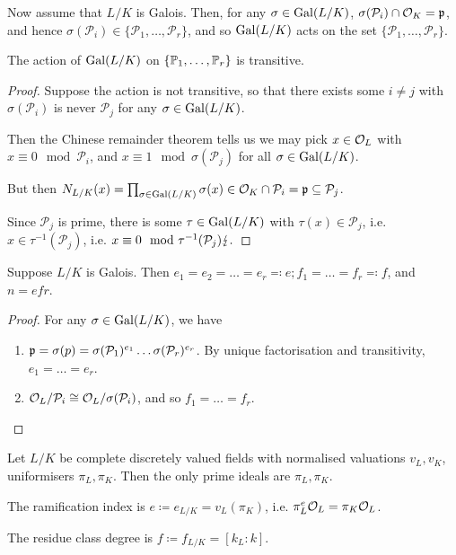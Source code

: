 \documentclass[10pt,a4paper]{article}
\begin{document}
Now assume that $L/K$ is Galois. Then, for any $\sigma \in \Gal(L/K)$, $\sigma(\mathcal{P}_i) \cap \O_K = \p$, and hence $\sigma(\mathcal{P}_i) \in \{\mathcal{P}_1, \ldots, \mathcal{P}_r\}$, and so $\Gal(L/K)$ acts on the set $\{\mathcal{P}_1, \ldots, \mathcal{P}_r\}$.

\begin{proposition}
  The action of $\Gal(L/K)$ on $\{\P_1, \ldots, \P_r\}$ is transitive.
\end{proposition}
\begin{proof}
  Suppose the action is not transitive, so that there exists some $i \neq j$ with $\sigma(\mathcal{P}_i)$ is never $\mathcal{P}_j$ for any $\sigma \in \Gal(L/K)$.

  Then the Chinese remainder theorem tells us we may pick $x \in \O_L$ with $x \equiv 0 \mod \mathcal{P}_i$, and $x \equiv 1 \mod \sigma(\mathcal{P}_j)$ for all $\sigma \in \Gal(L/K)$.

  But then $N_{L/K}(x) = \prod_{\sigma \in \Gal(L/K)} \sigma(x) \in \O_K \cap \mathcal{P}_i =\p \subseteq \mathcal{P}_j$.

  Since $\mathcal{P}_j$ is prime, there is some $\tau \in \Gal(L/K)$ with $\tau(x) \in \mathcal{P}_j$, i.e. $x \in\tau^{-1}(\mathcal{P}_j)$, i.e. $x \equiv 0 \mod \tau^{-1}(\mathcal{P}_j) \contr.$
\end{proof}
\begin{corollary}
  Suppose $L/K$ is Galois. Then $e_1 = e_2 = \ldots = e_r \eqqcolon e; f_1 = \ldots = f_r \eqqcolon f$, and $n = efr$.
\end{corollary}
\begin{proof}
  For any $\sigma \in \Gal(L/K)$, we have
  \begin{enumerate}
    \item $\p = \sigma(p) = \sigma(\mathcal{P}_1)^{e_1}\ldots \sigma(\mathcal{P}_r)^{e_r}$. By unique factorisation and transitivity, $e_1 = \ldots = e_r$.
    \item $\O_L/\mathcal{P}_i \cong \O_L/\sigma(\mathcal{P}_i)$, and so $f_1 = \ldots = f_r$.
  \end{enumerate}
\end{proof}
Let $L/K$ be complete discretely valued fields with normalised valuations $v_L, v_K$, uniformisers $\pi_L, \pi_K$. Then the only prime ideals are $\pi_L, \pi_K$.

The ramification index is $e \coloneqq e_{L/K} = v_L(\pi_K)$, i.e. $\pi_L^e \O_L = \pi_K \O_L$.

The residue class degree is $f \coloneqq f_{L/K} = [k_L:k]$.
\end{document}
